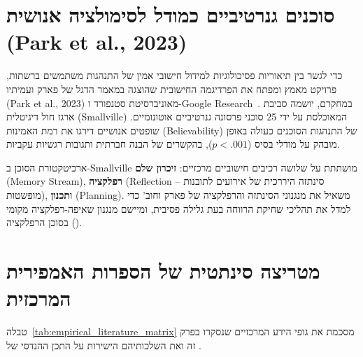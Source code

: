 \section{סוכנים גנרטיביים כמודל לסימולציה אנושית (Park et al., 2023)}
\label{sec:lit_flagship_park2023}
כדי לגשר בין תיאוריות פסיכולוגיות למידול חישובי אמין של התנהגות משתמשים ברשתות, פרויקט \projectname{} מאמץ ומפתח את הפרדיגמה החישובית שהוצגה במאמר הדגל של פארק ועמיתיו (\textenglish{Park et al., 2023}) מאוניברסיטת סטנפורד ו-\textenglish{Google Research}~\cite{park2023generative}. במחקרם, יושמה סביבת ארגז חול דיגיטלית (\textenglish{Smallville}) המאוכלסת על ידי 25 סוכני פרסונה גנרטיביים אוטונומיים. שופטים אנושיים דירגו את רמת האמינות (\textenglish{Believability}) של התנהגות הסוכנים כעולה באופן מובהק על מודלי בסיס ($p < .001$), בהקשרים של הבנה חברתית ותגובות רגשיות עקביות.

ארכיטקטורת הסוכן ב-\textenglish{Smallville} מושתתת על שלושה רכיבים חישוביים מרכזיים: \textbf{זיכרון שלם} (\textenglish{Memory Stream}), \textbf{רפלקציה} (\textenglish{Reflection} -- סינתזה היררכית של אירועים לתובנות מופשטות), ו\textbf{תכנון} (\textenglish{Planning}). \projectname{} משאיל את מנגנוני הסינתזה והרפלקציה של פארק וחוב' כדי למדל את תהליכי שחיקת הרווחה בעת גלילה פסיבית, ומיישם מנגנון שאיפה-רפלקציה מקומי בסוכן הרפלקציה (\agentReflector{}).

\section{מטריצה סינתטית של הספרות האמפירית המרכזית}
\label{sec:lit_summary_table}
טבלה~\ref{tab:empirical_literature_matrix} מסכמת את גופי הידע המרכזיים שנסקרו בפרק זה ואת השלכותיהם הישירות על התכן ההנדסי של \projectname{}.

